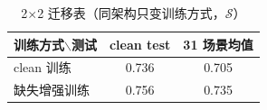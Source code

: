 \begin{table}[htbp]
  \centering
  \caption{2$\times$2 迁移表（同架构只变训练方式，$\mathcal{S}$）}
  \label{tab:p2-transfer}
  \begin{tabularx}{\textwidth}{@{}Xcc@{}}
    \toprule
    训练方式$\backslash$测试 & clean test & 31 场景均值 \\
    \midrule
    clean 训练 & 0.736 & 0.705 \\
    缺失增强训练 & 0.756 & 0.735 \\
    \bottomrule
  \end{tabularx}
  \par \smallskip
  \end{table}